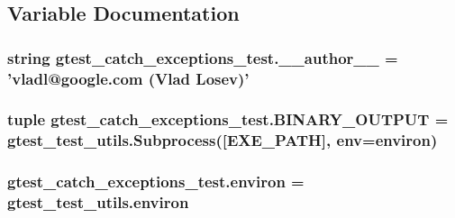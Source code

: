 \subsection{Variable Documentation}
\hypertarget{namespacegtest__catch__exceptions__test_a26e1831a55209b037dc7d8d3ca1e4f32}{
\subsubsection[{\-\_\-\-\_\-author\-\_\-\-\_\-}]{\setlength{\rightskip}{0pt plus 5cm}string gtest\-\_\-catch\-\_\-exceptions\-\_\-test.\-\_\-\-\_\-author\-\_\-\-\_\- = 'vladl@google.\-com (Vlad Losev)'}}\label{namespacegtest__catch__exceptions__test_a26e1831a55209b037dc7d8d3ca1e4f32}
\hypertarget{namespacegtest__catch__exceptions__test_a0116f4bc5b12d5f2edf7f0aa5ebdd121}{
\subsubsection[{B\-I\-N\-A\-R\-Y\-\_\-\-O\-U\-T\-P\-U\-T}]{\setlength{\rightskip}{0pt plus 5cm}tuple gtest\-\_\-catch\-\_\-exceptions\-\_\-test.\-B\-I\-N\-A\-R\-Y\-\_\-\-O\-U\-T\-P\-U\-T = {\bf gtest\-\_\-test\-\_\-utils.\-Subprocess}(\mbox{[}{\bf E\-X\-E\-\_\-\-P\-A\-T\-H}\mbox{]}, env={\bf environ})}}\label{namespacegtest__catch__exceptions__test_a0116f4bc5b12d5f2edf7f0aa5ebdd121}
\hypertarget{namespacegtest__catch__exceptions__test_ae51b794c28e667016c180f1b3fc85292}{
\subsubsection[{environ}]{\setlength{\rightskip}{0pt plus 5cm}gtest\-\_\-catch\-\_\-exceptions\-\_\-test.\-environ = gtest\-\_\-test\-\_\-utils.\-environ}}\label{namespacegtest__catch__exceptions__test_ae51b794c28e667016c180f1b3fc85292}
